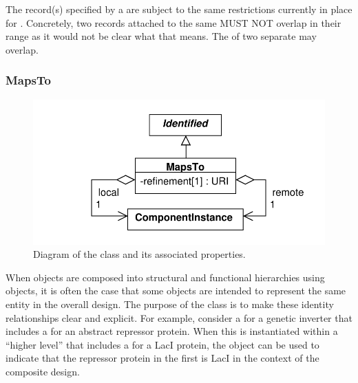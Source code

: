 The  record(s) specified by a  are subject to the same restrictions currently in place for  . Concretely, two  records attached to the same  MUST NOT overlap in their range as it would not be clear what that means. The  of two separate  may overlap.


\subsubsection{MapsTo}
\label{sec:MapsTo}

\begin{figure}[ht]
\begin{center}
\includegraphics[scale=0.6]{uml/maps_to}
\caption[]{Diagram of the  class and its associated properties.}
\label{uml:maps_to}
\end{center}
\end{figure}

When  objects are composed into structural and functional hierarchies using  objects, it is often the case that some  objects are intended to represent the same entity in the overall design. The purpose of the  class is to make these identity relationships clear and explicit.  For example, consider a  for a genetic inverter that includes a  for an abstract repressor protein.  When this  is instantiated within a ``higher level''  that includes a  for a LacI protein, the  object can be used to indicate that the repressor protein in the first  is LacI in the context of the composite design.

